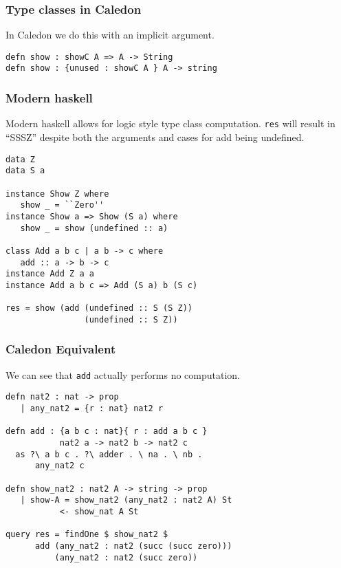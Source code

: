 
\begin{frame}[fragile]
\frametitle{Type classes in Caledon}

In Caledon we do this with an implicit argument.
\begin{lstlisting}
defn show : showC A => A -> String
defn show : {unused : showC A } A -> string
\end{lstlisting}
\end{frame}


\begin{frame}[fragile]
\frametitle{Modern haskell}

Modern haskell allows for logic style type class computation.
\verb|res| will result in ``SSSZ'' despite both
the arguments and cases for add being undefined.

\begin{lstlisting}
data Z
data S a

instance Show Z where
   show _ = ``Zero''
instance Show a => Show (S a) where
   show _ = show (undefined :: a)

class Add a b c | a b -> c where
   add :: a -> b -> c
instance Add Z a a
instance Add a b c => Add (S a) b (S c)

res = show (add (undefined :: S (S Z)) 
                (undefined :: S Z)) 
\end{lstlisting}
\end{frame}


\begin{frame}[fragile]
\frametitle{Caledon Equivalent}

We can see that \verb|add| actually performs no computation.

\begin{lstlisting}
defn nat2 : nat -> prop
   | any_nat2 = {r : nat} nat2 r

defn add : {a b c : nat}{ r : add a b c } 
           nat2 a -> nat2 b -> nat2 c
  as ?\ a b c . ?\ adder . \ na . \ nb . 
      any_nat2 c

defn show_nat2 : nat2 A -> string -> prop
   | show-A = show_nat2 (any_nat2 : nat2 A) St 
           <- show_nat A St

query res = findOne $ show_nat2 $ 
      add (any_nat2 : nat2 (succ (succ zero)))
          (any_nat2 : nat2 (succ zero))
                                 
\end{lstlisting}
\end{frame}
